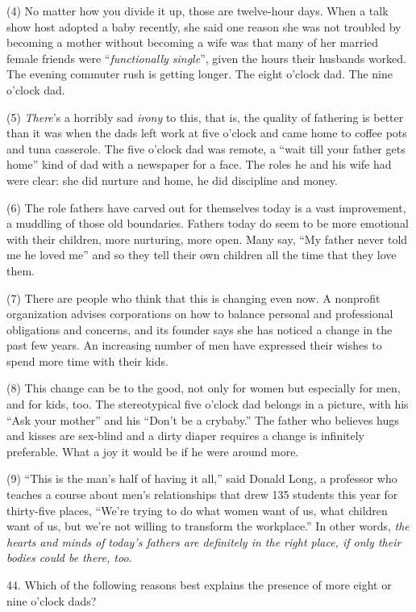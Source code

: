 \documentclass[UTF8,11pt]{ctexart}
\begin{document}
(4) No matter how you divide it up, those are twelve-hour days. When a talk show host adopted a baby recently, she said one reason she was not troubled by becoming a mother without becoming a wife was that many of her married female friends were “\textit{functionally single}”, given the hours their husbands worked. The evening commuter rush is getting longer. The eight o’clock dad. The nine o’clock dad.


(5) \textit{There}’s a horribly sad \textit{irony} to this, that is, the quality of fathering is better than it was when the dads left work at five o’clock and came home to coffee pots and tuna casserole. The five o’clock dad was remote, a “wait till your father gets home” kind of dad with a newspaper for a face. The roles he and his wife had were clear: she did nurture and home, he did discipline and money.


(6) The role fathers have carved out for themselves today is a vast improvement, a muddling of those old boundaries. Fathers today do seem to be more emotional with their children, more nurturing, more open. Many say, “My father never told me he loved me” and so they tell their own children all the time that they love them.


(7) There are people who think that this is changing even now. A nonprofit organization advises corporations on how to balance personal and professional obligations and concerns, and its founder says she has noticed a change in the past few years. An increasing number of men have expressed their wishes to spend more time with their kids.


(8) This change can be to the good, not only for women but especially for men, and for kids, too. The stereotypical five o’clock dad belongs in a picture, with his “Ask your mother” and his “Don’t be a crybaby.” The father who believes hugs and kisses are sex-blind and a dirty diaper requires a change is infinitely preferable. What a joy it would be if he were around more.


(9) “This is the man’s half of having it all,” said Donald Long, a professor who teaches a course about men’s relationships that drew 135 students this year for thirty-five places, “We’re trying to do what women want of us, what children want of us, but we’re not willing to transform the workplace.” In other words, \textit{the hearts and minds of} \textit{today’s fathers are definitely in the right place, if only their bodies could be there, too}.


44. Which of the following reasons best explains the presence of more eight or nine o’clock dads?
\end{document}
